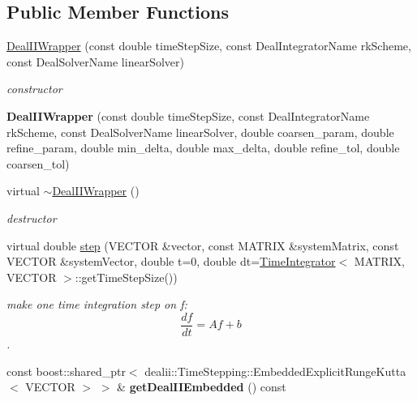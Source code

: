 \subsection*{Public Member Functions}
\begin{DoxyCompactItemize}
\item 
\hypertarget{classnatrium_1_1DealIIWrapper_a19bdd1ce28caf67d223d809d28359a02}{
\hyperlink{classnatrium_1_1DealIIWrapper_a19bdd1ce28caf67d223d809d28359a02}{DealIIWrapper} (const double timeStepSize, const DealIntegratorName rkScheme, const DealSolverName linearSolver)}
\label{classnatrium_1_1DealIIWrapper_a19bdd1ce28caf67d223d809d28359a02}

\begin{DoxyCompactList}\small\item\em constructor \item\end{DoxyCompactList}\item 
\hypertarget{classnatrium_1_1DealIIWrapper_a8f960bc0009457b1861f22273f331a01}{
{\bfseries DealIIWrapper} (const double timeStepSize, const DealIntegratorName rkScheme, const DealSolverName linearSolver, double coarsen\_\-param, double refine\_\-param, double min\_\-delta, double max\_\-delta, double refine\_\-tol, double coarsen\_\-tol)}
\label{classnatrium_1_1DealIIWrapper_a8f960bc0009457b1861f22273f331a01}

\item 
\hypertarget{classnatrium_1_1DealIIWrapper_a193b75fd9e4734d14988927c21312c8a}{
virtual \hyperlink{classnatrium_1_1DealIIWrapper_a193b75fd9e4734d14988927c21312c8a}{$\sim$DealIIWrapper} ()}
\label{classnatrium_1_1DealIIWrapper_a193b75fd9e4734d14988927c21312c8a}

\begin{DoxyCompactList}\small\item\em destructor \item\end{DoxyCompactList}\item 
virtual double \hyperlink{classnatrium_1_1DealIIWrapper_a62621205ff77a46c4f3ef01c3aefb06d}{step} (VECTOR \&vector, const MATRIX \&systemMatrix, const VECTOR \&systemVector, double t=0, double dt=\hyperlink{classnatrium_1_1TimeIntegrator}{TimeIntegrator}$<$ MATRIX, VECTOR $>$::getTimeStepSize())
\begin{DoxyCompactList}\small\item\em make one time integration step on f: \[ \frac{df}{dt} = Af+b \]. \item\end{DoxyCompactList}\item 
\hypertarget{classnatrium_1_1DealIIWrapper_aead07b81d0d8d218e8d4a435f1420b73}{
const boost::shared\_\-ptr$<$ dealii::TimeStepping::EmbeddedExplicitRungeKutta$<$ VECTOR $>$ $>$ \& {\bfseries getDealIIEmbedded} () const }
\label{classnatrium_1_1DealIIWrapper_aead07b81d0d8d218e8d4a435f1420b73}


\end{DoxyCompactItemize}
